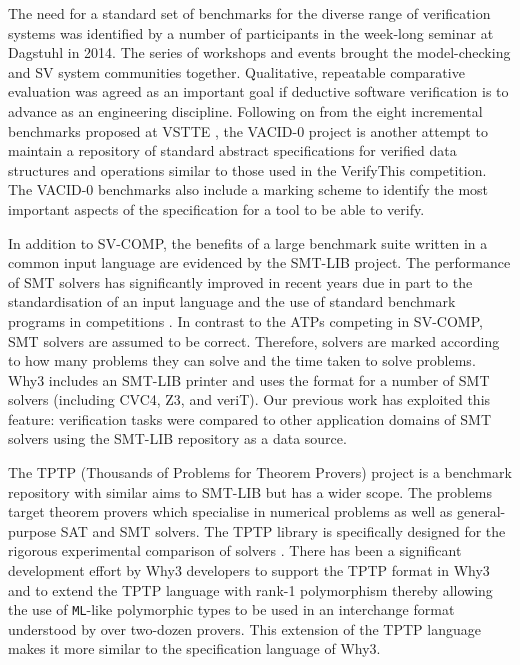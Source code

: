 The need for a standard set of benchmarks for the diverse range of verification systems was identified by a number of participants in the week-long seminar at Dagstuhl \cite{Dagstuhl} in 2014. The series of workshops and events brought the model-checking and SV system communities together. Qualitative, repeatable comparative evaluation was agreed as an important goal if deductive software verification is to advance as an engineering discipline. Following on from the eight incremental benchmarks proposed at VSTTE \cite{Weide2008}, the VACID-0 \cite{Leino10vacid-0:verification} project is another attempt to maintain a repository of standard abstract specifications for verified data structures and operations similar to those used in the VerifyThis competition. The VACID-0 benchmarks also include a marking scheme to identify the most important aspects of the specification for a tool to be able to verify.

In addition to SV-COMP, the benefits of a large benchmark suite written in a common input language are evidenced by the SMT-LIB \cite{SMTLIB} project. 
The performance of SMT solvers has significantly improved in recent years due in part to the standardisation of an input language and the use of standard benchmark programs in competitions \cite{SMTEVAL2013}. 
In contrast to the ATPs competing in SV-COMP, SMT solvers are assumed to be correct. Therefore, solvers are marked according to how many problems they can solve and the time taken to solve problems.
\textsf{Why3} includes an SMT-LIB printer and uses the format for a number of SMT solvers (including CVC4, Z3, and veriT). Our previous work \cite{Healy:2016} has exploited this feature: verification tasks were compared to other application domains of SMT solvers using the SMT-LIB repository as a data source.

The TPTP (Thousands of Problems for Theorem Provers) project \cite{TPTP} is a benchmark repository with similar aims to SMT-LIB but has a wider scope. The problems target theorem provers which specialise in numerical problems as well as general-purpose SAT and SMT solvers. The TPTP library is specifically designed for the rigorous experimental comparison of solvers \cite{Sutcliffe200139}. There has been a significant development effort by \textsf{Why3} developers to support the TPTP format in \textsf{Why3} and to extend the TPTP language with rank-1 polymorphism \cite{why:tptp} thereby allowing the use of \texttt{ML}-like polymorphic types to be used in an interchange format understood by over two-dozen provers. This extension of the TPTP language makes it more similar to the specification language of \textsf{Why3}. 

